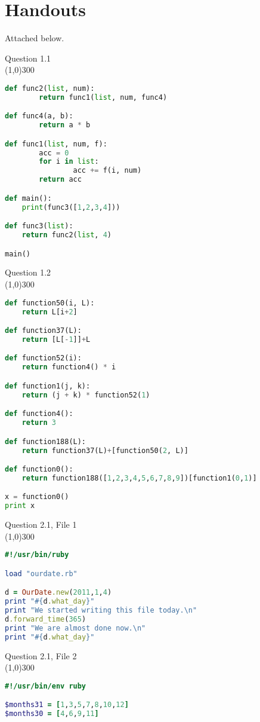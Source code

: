 \documentclass{article}
\begin{document}
\section{Handouts}
Attached below.
\newpage
{\Large
Question 1.1 \\
\line(1,0){300}
\begin{lstlisting}[language=python]
def func2(list, num):
		return func1(list, num, func4)

def func4(a, b):
		return a * b

def func1(list, num, f):
		acc = 0
		for i in list:
				acc += f(i, num)
		return acc

def main():
	print(func3([1,2,3,4]))

def func3(list):
	return func2(list, 4)

main()

\end{lstlisting}
\newpage
Question 1.2 \\
\line(1,0){300}
\begin{lstlisting}[language=python]
def function50(i, L):
	return L[i+2]

def function37(L):
	return [L[-1]]+L

def function52(i):
	return function4() * i

def function1(j, k):
	return (j + k) * function52(1)

def function4():
	return 3

def function188(L):
	return function37(L)+[function50(2, L)]

def function0():
	return function188([1,2,3,4,5,6,7,8,9])[function1(0,1)]

x = function0()
print x

\end{lstlisting}
\newpage
Question 2.1, File 1 \\
\line(1,0){300}
\begin{lstlisting}[language=ruby]
#!/usr/bin/ruby

load "ourdate.rb"

d = OurDate.new(2011,1,4)
print "#{d.what_day}"
print "We started writing this file today.\n"
d.forward_time(365)
print "We are almost done now.\n"
print "#{d.what_day}"

\end{lstlisting}
\newpage
Question 2.1, File 2 \\
\line(1,0){300}
\begin{lstlisting}[language=ruby]
#!/usr/bin/env ruby

$months31 = [1,3,5,7,8,10,12]
$months30 = [4,6,9,11]


\end{lstlisting}}
\end{document}
